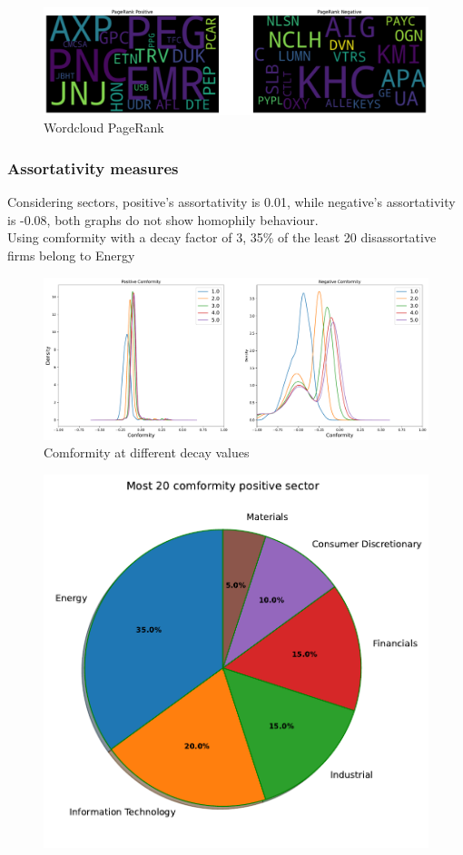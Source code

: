 \documentclass[sigchi]{acmart}
\begin{document}
\begin{figure}[H]
	\centering
	\includegraphics[width= \linewidth]{plot/wordcloud_pagerank.pdf}
	\caption{Wordcloud PageRank}
\end{figure}
\subsubsection{Assortativity measures}
Considering sectors, positive's assortativity is 0.01, while negative's assortativity is -0.08, both graphs do not show homophily behaviour.\\
Using comformity with a decay factor of 3, 35\% of the least 20 disassortative firms belong to Energy
\begin{figure}[H]
	\centering
	\includegraphics[width=\linewidth]{plot/comformity.pdf}
	\caption{Comformity at different decay values}
\end{figure}
\begin{figure}[H]
	\centering
	\includegraphics[width=0.65\linewidth]{plot/pie_comf_pos.pdf}
\end{figure}
\end{document}
